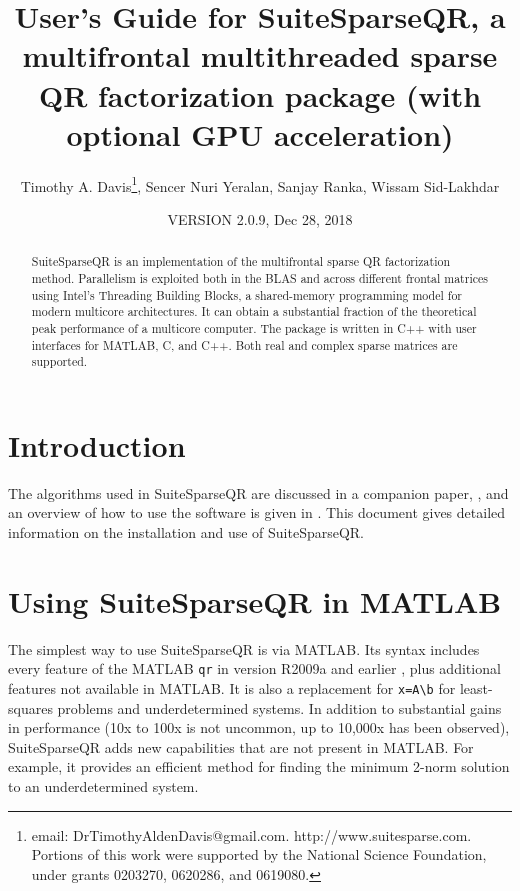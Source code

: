 \documentclass[12pt]{article}
\title{User's Guide for SuiteSparseQR, a multifrontal multithreaded sparse
QR factorization package (with optional GPU acceleration)}
\author{Timothy A. Davis\thanks{
email: DrTimothyAldenDavis@gmail.com.
http://www.suitesparse.com.
Portions of this work were supported by the National
Science Foundation, under grants 0203270, 0620286, and 0619080.},
Sencer Nuri Yeralan, Sanjay Ranka, Wissam Sid-Lakhdar}
\date{VERSION 2.0.9, Dec 28, 2018}
\begin{document}
\maketitle

\begin{abstract}

SuiteSparseQR is an implementation of the multifrontal sparse QR factorization
method.  Parallelism is exploited both in the BLAS and across different frontal
matrices using Intel's Threading Building Blocks, a shared-memory programming
model for modern multicore architectures.  It can obtain a substantial fraction
of the theoretical peak performance of a multicore computer.  The package is
written in C++ with user interfaces for MATLAB, C, and C++.  Both real and
complex sparse matrices are supported.

\end{abstract}

\maketitle

\section{Introduction}
\label{intro}

The algorithms used in SuiteSparseQR are discussed in a companion paper,
\cite{Davis08a}, and an overview of how to use the software is given in
\cite{Davis08b}.  This document gives detailed information on the installation
and use of SuiteSparseQR.

\section{Using SuiteSparseQR in MATLAB}

The simplest way to use SuiteSparseQR is via MATLAB.  Its syntax includes every
feature of the MATLAB \verb'qr' in version R2009a and earlier
\cite{GilbertMolerSchreiber}, plus additional features not available in MATLAB.
It is also a replacement for \verb'x=A\b' for least-squares problems and
underdetermined systems.  In addition to substantial gains in performance (10x
to 100x is not uncommon, up to 10,000x has been observed), SuiteSparseQR adds
new capabilities that are not present in MATLAB.  For example, it provides an
efficient method for finding the minimum 2-norm solution to an underdetermined
system.
\end{document}
